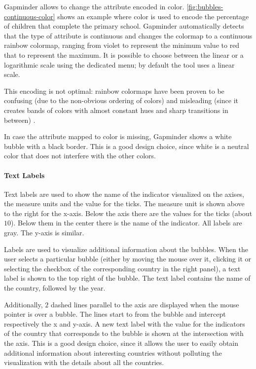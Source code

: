 Gapminder allows to change the attribute encoded in color.
\cref{fig:bubbles-continuous-color} shows an example where color is used to encode the percentage of children that complete the primary school.
Gapminder automatically detects that the type of attribute is continuous and changes the colormap to a continuous rainbow colormap, ranging from violet to represent the minimum value to red that to represent the maximum. It is possible to choose between the linear or a logarithmic scale using the dedicated menu; by default the tool uses a linear scale.

This encoding is not optimal:
rainbow colormaps have been proven to be confusing (due to the non-obvious ordering of colors) and misleading (since it creates bands of colors with almost constant hues and sharp transitions in between) \cite{color-maps}.

In case the attribute mapped to color is missing, Gapminder shows a white bubble with a black border.
This is a good design choice, since white is a neutral color that does not interfere with the other colors.

\paragraph{Text Labels}
Text labels are used to show the name of the indicator visualized on the axises, the measure units and the value for the ticks.
The measure unit is shown above to the right for the x-axis.
Below the axis there are the values for the ticks (about $10$).
Below them in the center there is the name of the indicator.
All labels are gray.
The y-axis is similar.

Labels are used to visualize additional information about the bubbles.
When the user selects a particular bubble (either by moving the mouse over it, clicking it or selecting the checkbox of the corresponding country in the right panel), a text label is shown to the top right of the bubble.
The text label contains the name of the country, followed by the year.

Additionally, $2$ dashed lines parallel to the axis are displayed when the mouse pointer is over a bubble.
The lines start to from the bubble and intercept respectively the x and y-axis.
A new text label with the value for the indicators of the country that corresponds to the bubble is shown at the intersection with the axis.
This is a good design choice, since it allows the user to easily obtain additional information about interesting countries without polluting the visualization with the details about all the countries.

